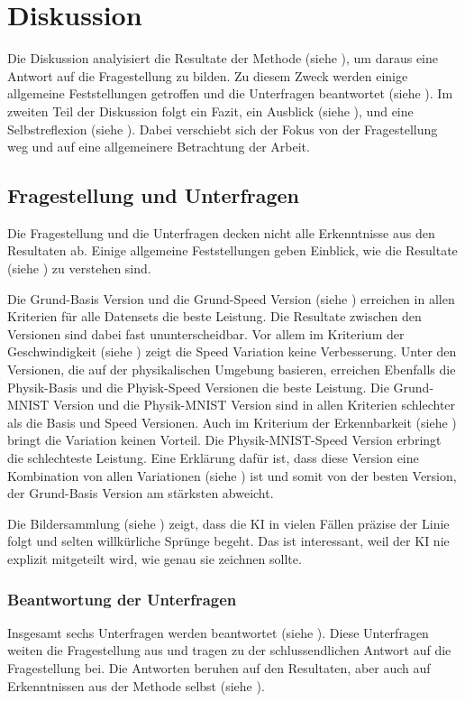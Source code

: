 \chapter{Diskussion}\label{chap:d}
Die Diskussion analyisiert die Resultate der Methode (siehe ),
um daraus eine Antwort auf die Fragestellung zu bilden. Zu diesem Zweck werden
einige allgemeine Feststellungen getroffen und die Unterfragen beantwortet
(siehe ). Im zweiten Teil der Diskussion folgt ein Fazit,
ein Ausblick (siehe ), und eine Selbstreflexion (siehe
). Dabei verschiebt sich der Fokus von der Fragestellung
weg und auf eine allgemeinere Betrachtung der Arbeit.


\section{Fragestellung und Unterfragen}\label{chap:d_frage}
Die Fragestellung und die Unterfragen decken nicht alle Erkenntnisse aus den
Resultaten ab. Einige allgemeine Feststellungen geben Einblick, wie die
Resultate (siehe ) zu verstehen sind. 

Die Grund-Basis Version und die Grund-Speed Version (siehe
) erreichen in allen Kriterien für alle Datensets die
beste Leistung. Die Resultate zwischen den Versionen sind dabei fast
ununterscheidbar. Vor allem im Kriterium der Geschwindigkeit (siehe
) zeigt die Speed Variation keine Verbesserung. Unter
den Versionen, die auf der physikalischen Umgebung basieren, erreichen Ebenfalls
die Physik-Basis und die Phyisk-Speed Versionen die beste Leistung. Die
Grund-MNIST Version und die Physik-MNIST Version sind in allen Kriterien
schlechter als die Basis und Speed Versionen. Auch im Kriterium der
Erkennbarkeit (siehe ) bringt die Variation keinen
Vorteil. Die Physik-MNIST-Speed Version erbringt die schlechteste Leistung. Eine
Erklärung dafür ist, dass diese Version eine Kombination von allen Variationen
(siehe ) ist und somit von der besten Version, der
Grund-Basis Version am stärksten abweicht.

Die Bildersammlung (siehe ) zeigt, dass die KI in vielen
Fällen präzise der Linie folgt und selten willkürliche Sprünge begeht. Das ist
interessant, weil der KI nie explizit mitgeteilt wird, wie genau sie zeichnen
sollte.


\subsection{Beantwortung der Unterfragen}\label{sub:d_frage_unter}
Insgesamt sechs Unterfragen werden beantwortet (siehe ).
Diese Unterfragen weiten die Fragestellung aus und tragen zu der
schlussendlichen Antwort auf die Fragestellung bei. Die Antworten beruhen auf
den Resultaten, aber auch auf Erkenntnissen aus der Methode selbst (siehe
).

